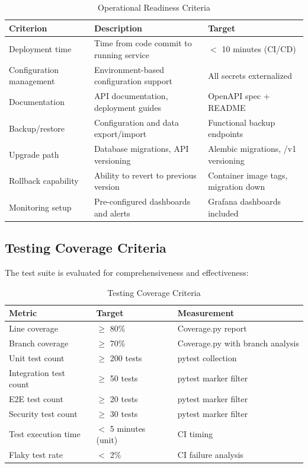 \begin{table}[htbp]
\centering
\caption{Operational Readiness Criteria}
\label{tab:operational-eval}
\small
\begin{tabularx}{\textwidth}{|l|X|l|}
\hline
\textbf{Criterion} & \textbf{Description} & \textbf{Target} \\
\hline
Deployment time & Time from code commit to running service & $<$ 10 minutes (CI/CD) \\
\hline
Configuration management & Environment-based configuration support & All secrets externalized \\
\hline
Documentation & API documentation, deployment guides & OpenAPI spec + README \\
\hline
Backup/restore & Configuration and data export/import & Functional backup endpoints \\
\hline
Upgrade path & Database migrations, API versioning & Alembic migrations, /v1 versioning \\
\hline
Rollback capability & Ability to revert to previous version & Container image tags, migration down \\
\hline
Monitoring setup & Pre-configured dashboards and alerts & Grafana dashboards included \\
\hline
\end{tabularx}
\end{table}

\subsection{Testing Coverage Criteria}
\label{subsec:testing-criteria}

The test suite is evaluated for comprehensiveness and effectiveness:

\begin{table}[htbp]
\centering
\caption{Testing Coverage Criteria}
\label{tab:testing-eval}
\small
\begin{tabularx}{\textwidth}{|l|l|X|}
\hline
\textbf{Metric} & \textbf{Target} & \textbf{Measurement} \\
\hline
Line coverage & $\geq$ 80\% & Coverage.py report \\
\hline
Branch coverage & $\geq$ 70\% & Coverage.py with branch analysis \\
\hline
Unit test count & $\geq$ 200 tests & pytest collection \\
\hline
Integration test count & $\geq$ 50 tests & pytest marker filter \\
\hline
E2E test count & $\geq$ 20 tests & pytest marker filter \\
\hline
Security test count & $\geq$ 30 tests & pytest marker filter \\
\hline
Test execution time & $<$ 5 minutes (unit) & CI timing \\
\hline
Flaky test rate & $<$ 2\% & CI failure analysis \\
\hline
\end{tabularx}
\end{table}

